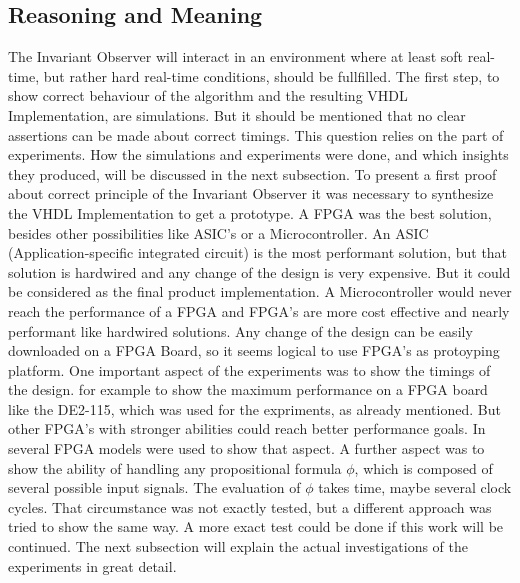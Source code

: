 \subsection{Reasoning and Meaning}
The Invariant Observer will interact in an environment where at least soft real-time, but rather hard real-time conditions, should be fullfilled.
The first step, to show  correct behaviour of the algorithm and the resulting VHDL Implementation, are simulations. But it should be mentioned that no 
clear assertions can be made about correct timings. This question relies on the part of experiments. How the simulations and experiments were done, and which insights
they produced, will be discussed in the next subsection.
To present a first proof about correct principle of the Invariant Observer it was necessary to synthesize the VHDL Implementation to get a prototype.
A FPGA was the best solution, besides other possibilities like ASIC's or a Microcontroller. An ASIC (Application-specific integrated circuit) is the most performant solution, but
that solution is hardwired and any change of the design is very expensive. But it could be considered as the final product implementation.
A Microcontroller would never reach the performance of a FPGA and FPGA's are more cost effective and nearly performant like hardwired solutions. 
Any change of the design can be easily downloaded on a FPGA Board, so it seems logical to use FPGA's as protoyping platform.
One important aspect of the experiments was to show the timings of the design. 
for example to show the maximum performance on a FPGA board like the DE2-115, which was used for the expriments, as already mentioned.
But other FPGA's with stronger abilities could reach better performance goals. In \cite{RTFMBJ13} several FPGA models were used to show that aspect.      
A further aspect was to show the ability of handling any propositional formula $\phi$, which is composed of several possible input signals.
The evaluation of $\phi$ takes time, maybe several clock cycles. That circumstance was not exactly tested, but a different approach was
tried to show the same way. A more exact test could be done if this work will be continued.
The next subsection will explain the actual investigations of the experiments in great detail.  
